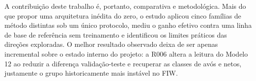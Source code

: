 A contribuição deste trabalho é, portanto, comparativa e metodológica. Mais do que propor uma arquitetura inédita do zero, o estudo aplicou cinco famílias de método distintas sob um único protocolo, mediu o ganho efetivo contra uma linha de base de referência sem treinamento e identificou os limites práticos das direções exploradas. O melhor resultado observado deixa de ser apenas incremental sobre o estado interno do projeto: a R006 altera a leitura do Modelo 12 ao reduzir a diferença validação-teste e recuperar as classes de avós e netos, justamente o grupo historicamente mais instável no FIW.
